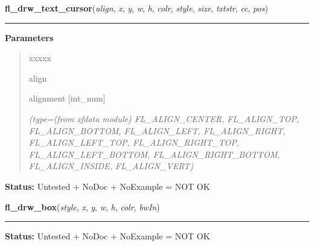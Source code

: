 \hspace{.8\funcindent}\begin{boxedminipage}{\funcwidth}

    \raggedright \textbf{fl\_drw\_text\_cursor}(\textit{align}, \textit{x}, \textit{y}, \textit{w}, \textit{h}, \textit{colr}, \textit{style}, \textit{size}, \textit{txtstr}, \textit{cc}, \textit{pos})

    \vspace{-1.5ex}

    \rule{\textwidth}{0.5\fboxrule}
\setlength{\parskip}{2ex}
\setlength{\parskip}{1ex}
      \textbf{Parameters}
      \vspace{-1ex}

      \begin{quote}
        \begin{Ventry}{xxxxx}

          \item[align]

          alignment [int\_num]

            {\it (type=(from xfdata module) FL\_ALIGN\_CENTER, FL\_ALIGN\_TOP, FL\_ALIGN\_BOTTOM, 
FL\_ALIGN\_LEFT, FL\_ALIGN\_RIGHT, FL\_ALIGN\_LEFT\_TOP, 
FL\_ALIGN\_RIGHT\_TOP, FL\_ALIGN\_LEFT\_BOTTOM, FL\_ALIGN\_RIGHT\_BOTTOM, 
FL\_ALIGN\_INSIDE, FL\_ALIGN\_VERT)}

        \end{Ventry}

      \end{quote}

\textbf{Status:} Untested + NoDoc + NoExample = NOT OK



    \end{boxedminipage}

    \label{xformslib:library:fl_drw_box}

    \vspace{0.5ex}

\hspace{.8\funcindent}\begin{boxedminipage}{\funcwidth}

    \raggedright \textbf{fl\_drw\_box}(\textit{style}, \textit{x}, \textit{y}, \textit{w}, \textit{h}, \textit{colr}, \textit{bwIn})

    \vspace{-1.5ex}

    \rule{\textwidth}{0.5\fboxrule}
\setlength{\parskip}{2ex}
\setlength{\parskip}{1ex}
\textbf{Status:} Untested + NoDoc + NoExample = NOT OK



    \end{boxedminipage}

